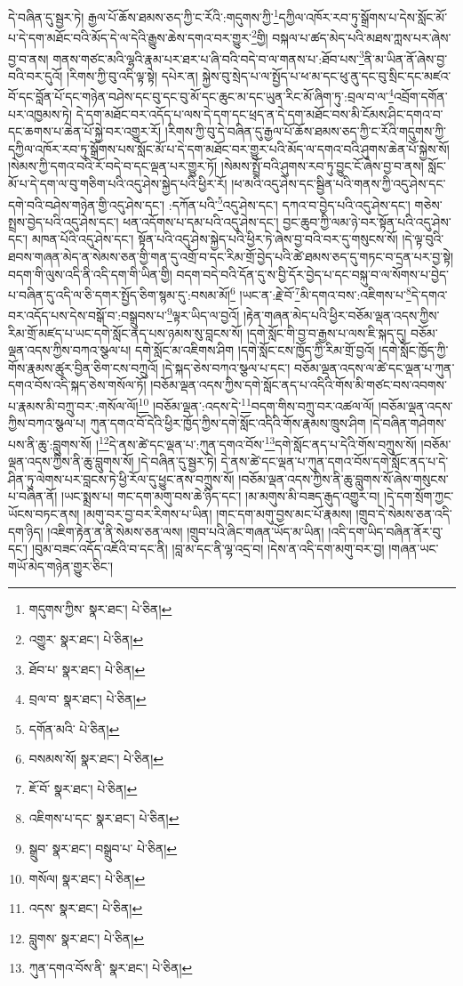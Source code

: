 དེ་བཞིན་དུ་སྦྱར་ཏེ། རྒྱལ་པོ་ཆོས་ཐམས་ཅད་ཀྱི་ང་རོའི་:གདུགས་ཀྱི་\footnote{གདུགས་ཀྱིས་  སྣར་ཐང་།  པེ་ཅིན། }དཀྱིལ་འཁོར་རབ་ཏུ་སྒྲོགས་པ་དེས་སློང་མོ་པ་དེ་དག་མཐོང་བའི་མོད་དེ་ལ་དེའི་རྒྱུས་ཆེས་དགའ་བར་གྱུར་\footnote{འགྱུར་  སྣར་ཐང་།  པེ་ཅིན། }གྱི། བསྐལ་པ་ཚད་མེད་པའི་མཐས་ཀླས་པར་ཞེས་བྱ་བ་ནས། གནས་གཙང་མའི་ལྷའི་རྣམ་པར་ཐར་པ་ཞི་བའི་བདེ་བ་ལ་གནས་པ་:ཐོབ་པས་\footnote{ཐོབ་པ་  སྣར་ཐང་།  པེ་ཅིན། }ནི་མ་ཡིན་ནོ་ཞེས་བྱ་བའི་བར་དུའོ། །རིགས་ཀྱི་བུ་འདི་ལྟ་སྟེ། དཔེར་ན། སྐྱེས་བུ་སྲེད་པ་ལ་སྤྱོད་པ་ཕ་མ་དང་ཕུ་ནུ་དང་བུ་སྲིང་དང་མཛའ་བོ་དང་བློན་པོ་དང་གཉེན་བཤེས་དང་བུ་དང་བུ་མོ་དང་ཆུང་མ་དང་ཡུན་རིང་མོ་ཞིག་ཏུ་:བྲལ་བ་ལ་\footnote{བྲལ་བ་  སྣར་ཐང་།  པེ་ཅིན། }འབྲོག་དགོན་པར་འཁྱམས་ཏེ། དེ་དག་མཐོང་བར་འདོད་པ་ལས་དེ་དག་དང་ཕྲད་ན་དེ་དག་མཐོང་བས་མི་ངོམས་ཤིང་དགའ་བ་དང་ཆགས་པ་ཆེན་པོ་སྐྱེ་བར་འགྱུར་རོ། །རིགས་ཀྱི་བུ་དེ་བཞིན་དུ་རྒྱལ་པོ་ཆོས་ཐམས་ཅད་ཀྱི་ང་རོའི་གདུགས་ཀྱི་དཀྱིལ་འཁོར་རབ་ཏུ་སྒྲོགས་པས་སློང་མོ་པ་དེ་དག་མཐོང་བར་གྱུར་པའི་མོད་ལ་དགའ་བའི་ཤུགས་ཆེན་པོ་སྐྱེས་སོ། །སེམས་ཀྱི་དགའ་བའི་རོ་བདེ་བ་དང་ལྡན་པར་གྱུར་ཏོ། །སེམས་སྤྲོ་བའི་ཤུགས་རབ་ཏུ་བྱུང་ངོ་ཞེས་བྱ་བ་ནས། སློང་མོ་པ་དེ་དག་ལ་བུ་གཅིག་པའི་འདུ་ཤེས་སྐྱེད་པའི་ཕྱིར་རོ། །ཕ་མའི་འདུ་ཤེས་དང་སྦྱིན་པའི་གནས་ཀྱི་འདུ་ཤེས་དང་དགེ་བའི་བཤེས་གཉེན་གྱི་འདུ་ཤེས་དང་། :དཀོན་པའི་\footnote{དགོན་མའི་  པེ་ཅིན། }འདུ་ཤེས་དང་། དཀའ་བ་བྱེད་པའི་འདུ་ཤེས་དང་། གཅེས་སྤྲས་བྱེད་པའི་འདུ་ཤེས་དང་། ཕན་འདོགས་པ་དམ་པའི་འདུ་ཤེས་དང་། བྱང་ཆུབ་ཀྱི་ལམ་ཉེ་བར་སྟོན་པའི་འདུ་ཤེས་དང་། མཁན་པོའི་འདུ་ཤེས་དང་། སྟོན་པའི་འདུ་ཤེས་སྐྱེད་པའི་ཕྱིར་ཏེ་ཞེས་བྱ་བའི་བར་དུ་གསུངས་སོ། །དེ་ལྟ་བུའི་ཐབས་གཞན་མེད་ན་སེམས་ཅན་གྱི་གན་དུ་འགྲོ་བ་དང་རིམ་གྲོ་བྱེད་པའི་ཚེ་ཐམས་ཅད་དུ་གཏང་བ་དྲན་པར་བྱ་སྟེ། བདག་གི་ལུས་འདི་ནི་འདི་དག་གི་ཡིན་གྱི། བདག་བདེ་བའི་དོན་དུ་ས་བྱི་དོར་བྱེད་པ་དང་བསྐུ་བ་ལ་སོགས་པ་བྱེད་པ་བཞིན་དུ་འདི་ལ་ཅི་དགར་སྤྱོད་ཅིག་སྙམ་དུ་:བསམ་མོ།\footnote{བསམས་སོ།  སྣར་ཐང་།  པེ་ཅིན། } །ཡང་ན་:རྗེ་བོ་\footnote{ཇོ་བོ་  སྣར་ཐང་།  པེ་ཅིན། }མི་དགའ་བས་:འཇིགས་པ་\footnote{འཇིགས་པ་དང་  སྣར་ཐང་།  པེ་ཅིན། }དེ་དགའ་བར་འདོད་པས་དེས་བསྒོ་བ་:བསྒྲུབས་པ་\footnote{སྒྲུབ་  སྣར་ཐང་། བསྒྲུབ་པ་  པེ་ཅིན། }ལྟར་ཡིད་ལ་བྱའོ། །རྟེན་གཞན་མེད་པའི་ཕྱིར་བཅོམ་ལྡན་འདས་ཀྱིས་རིམ་གྲོ་མཛད་པ་ཡང་དགེ་སློང་ནད་པས་ཉམས་སུ་བླངས་སོ། །དགེ་སློང་གི་བྱ་བ་རྒྱས་པ་ལས་ཇི་སྐད་དུ། བཅོམ་ལྡན་འདས་ཀྱིས་བཀའ་སྩལ་པ། དགེ་སློང་མ་འཇིགས་ཤིག །དགེ་སློང་ངས་ཁྱོད་ཀྱི་རིམ་གྲོ་བྱའོ། །དགེ་སློང་ཁྱོད་ཀྱི་གོས་རྣམས་ཚུར་བྱིན་ཅིག་ངས་བཀྲུའོ། །དེ་སྐད་ཅེས་བཀའ་སྩལ་པ་དང་། བཅོམ་ལྡན་འདས་ལ་ཚེ་དང་ལྡན་པ་ཀུན་དགའ་བོས་འདི་སྐད་ཅེས་གསོལ་ཏོ། །བཅོམ་ལྡན་འདས་ཀྱིས་དགེ་སློང་ནད་པ་འདིའི་གོས་མི་གཙང་བས་འབགས་པ་རྣམས་མི་བཀྲུ་བར་:གསོལ་ལོ།\footnote{གསོལ།  སྣར་ཐང་།  པེ་ཅིན། } །བཅོམ་ལྡན་:འདས་དེ་\footnote{འདས་  སྣར་ཐང་།  པེ་ཅིན། }བདག་གིས་བཀྲུ་བར་འཚལ་ལོ། །བཅོམ་ལྡན་འདས་ཀྱིས་བཀའ་སྩལ་པ། ཀུན་དགའ་བོ་དེའི་ཕྱིར་ཁྱོད་ཀྱིས་དགེ་སློང་འདིའི་གོས་རྣམས་ཁྲུས་ཤིག །དེ་བཞིན་གཤེགས་པས་ནི་ཆུ་:བླུགས་སོ། །\footnote{བླུགས་  སྣར་ཐང་།  པེ་ཅིན། }དེ་ནས་ཚེ་དང་ལྡན་པ་:ཀུན་དགའ་བོས་\footnote{ཀུན་དགའ་བོས་ནི་  སྣར་ཐང་།  པེ་ཅིན། }དགེ་སློང་ནད་པ་དེའི་གོས་བཀྲུས་སོ། །བཅོམ་ལྡན་འདས་ཀྱིས་ནི་ཆུ་བླུགས་སོ། །དེ་བཞིན་དུ་སྦྱར་ཏེ། དེ་ནས་ཚེ་དང་ལྡན་པ་ཀུན་དགའ་བོས་དགེ་སློང་ནད་པ་དེ་ཤིན་ཏུ་ལེགས་པར་བླངས་ཏེ་ཕྱི་རོལ་དུ་ཕྱུང་ནས་བཀྲུས་སོ། །བཅོམ་ལྡན་འདས་ཀྱིས་ནི་ཆུ་བླུགས་སོ་ཞེས་གསུངས་པ་བཞིན་ནོ། །ཡང་སྨྲས་པ། གང་དག་མགུ་བས་ཆེ་ཉིད་དང་། །མ་མགུས་མི་བཟད་རྒུད་འགྱུར་བ། །དེ་དག་སྲོག་ཀྱང་ཡོངས་བཏང་ནས། །མགུ་བར་བྱ་བར་རིགས་པ་ཡིན། །གང་དག་མགུ་བྱས་མང་པོ་རྣམས། །གྲུབ་དེ་སེམས་ཅན་འདི་དག་ཉིད། །འཇིག་རྟེན་ན་ནི་སེམས་ཅན་ལས། །གྲུབ་པའི་ཞིང་གཞན་ཡོད་མ་ཡིན། །འདི་དག་ཡིད་བཞིན་ནོར་བུ་དང་། །བུམ་བཟང་འདོད་འཇོའི་བ་དང་ནི། །བླ་མ་དང་ནི་ལྷ་འདྲ་བ། །དེས་ན་འདི་དག་མགུ་བར་བྱ། །གཞན་ཡང་གཡོ་མེད་གཉེན་གྱུར་ཅིང་། 